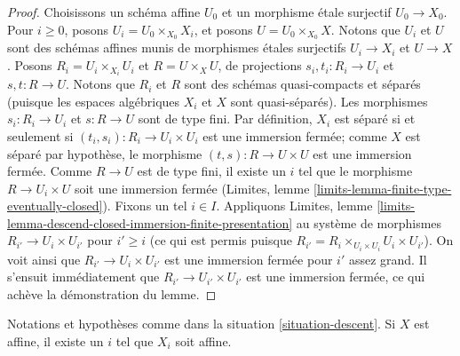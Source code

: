 \begin{proof}
Choisissons un schéma affine $U_0$ et un morphisme étale surjectif $U_0 \to X_0$.
Pour $i \geq 0$, posons $U_i = U_0 \times_{X_0} X_i$, et posons
$U = U_0 \times_{X_0} X$. Notons que $U_i$ et $U$ sont des schémas affines
munis de morphismes étales surjectifs $U_i \to X_i$
et $U \to X$. Posons $R_i = U_i \times_{X_i} U_i$ et $R = U \times_X U$,
de projections $s_i, t_i : R_i \to U_i$ et $s, t : R \to U$.
Notons que $R_i$ et $R$ sont des schémas quasi-compacts et séparés (puisque les
espaces algébriques $X_i$ et $X$ sont quasi-séparés). Les morphismes
$s_i : R_i \to U_i$ et $s : R \to U$ sont de type fini.
Par définition, $X_i$ est séparé si et seulement si
$(t_i, s_i) : R_i \to U_i \times U_i$
est une immersion fermée; comme $X$ est séparé par hypothèse,
le morphisme $(t, s) : R \to U \times U$ est une immersion fermée. Comme
$R \to U$ est de type fini, il existe un
$i$ tel que le morphisme $R \to U_i \times U$ soit une immersion fermée
(Limites, lemme \ref{limits-lemma-finite-type-eventually-closed}).
Fixons un tel $i \in I$. Appliquons Limites, lemme
\ref{limits-lemma-descend-closed-immersion-finite-presentation}
au système de morphismes $R_{i'} \to U_i \times U_{i'}$ pour $i' \geq i$
(ce qui est permis puisque
$R_{i'} = R_i \times_{U_i \times U_i} U_i \times U_{i'}$).
On voit ainsi que $R_{i'} \to U_i \times U_{i'}$ est une immersion fermée
pour $i'$ assez grand. Il s'ensuit immédiatement
que $R_{i'} \to U_{i'} \times U_{i'}$ est une immersion fermée,
ce qui achève la démonstration du lemme.
\end{proof}

\begin{lemma}
\label{lemma-limit-is-affine}
Notations et hypothèses comme dans la situation \ref{situation-descent}.
Si $X$ est affine, il existe un $i$ tel que $X_i$ soit affine.
\end{lemma}

